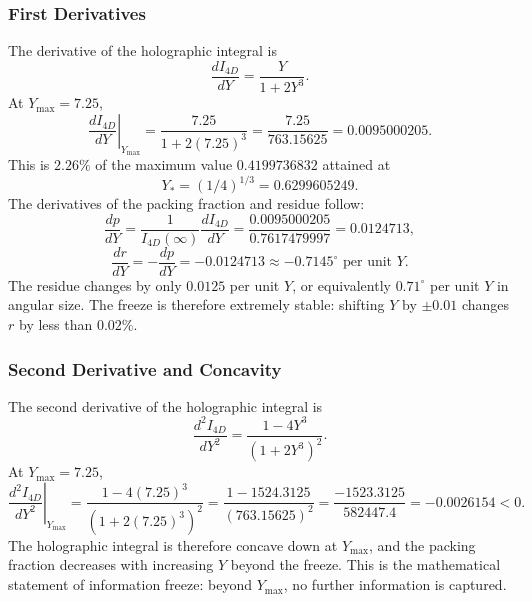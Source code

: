 \documentclass[a4paper,1pt,oneside,openany]{book}
\begin{document}
\subsubsection{First Derivatives}

The derivative of the holographic integral is
\begin{equation}
\frac{dI_{4D}}{dY} = \frac{Y}{1 + 2Y^3}.
\label{eq:dI4D-dY}
\end{equation}
At $Y_{\max} = 7.25$,
\begin{equation}
\left.\frac{dI_{4D}}{dY}\right|_{Y_{\max}} = \frac{7.25}{1 + 2(7.25)^3} = \frac{7.25}{763.15625} = 0.0095000205.
\label{eq:dI4D-dY-Ymax}
\end{equation}
This is $2.26\%$ of the maximum value $0.4199736832$ attained at
\begin{equation}
Y_* = (1/4)^{1/3} = 0.6299605249.
\label{eq:Ystar}
\end{equation}
The derivatives of the packing fraction and residue follow:
\begin{equation}
\frac{dp}{dY} = \frac{1}{I_{4D}(\infty)} \frac{dI_{4D}}{dY} = \frac{0.0095000205}{0.7617479997} = 0.0124713,
\label{eq:dp-dY}
\end{equation}
\begin{equation}
\boxed{\frac{dr}{dY} = -\frac{dp}{dY} = -0.0124713 \approx -0.7145^\circ \text{ per unit } Y.}
\label{eq:dr-dY}
\end{equation}
The residue changes by only $0.0125$ per unit $Y$, or equivalently $0.71^\circ$ per unit $Y$ in angular size. The freeze is therefore extremely stable: shifting $Y$ by $\pm 0.01$ changes $r$ by less than $0.02\%$.

\subsubsection{Second Derivative and Concavity}

The second derivative of the holographic integral is
\begin{equation}
\frac{d^2I_{4D}}{dY^2} = \frac{1 - 4Y^3}{(1 + 2Y^3)^2}.
\label{eq:d2I4D-dY2}
\end{equation}
At $Y_{\max} = 7.25$,
\begin{equation}
\left.\frac{d^2I_{4D}}{dY^2}\right|_{Y_{\max}} = \frac{1 - 4(7.25)^3}{(1 + 2(7.25)^3)^2} = \frac{1 - 1524.3125}{(763.15625)^2} = \frac{-1523.3125}{582447.4} = -0.0026154 < 0.
\label{eq:d2I4D-dY2-Ymax}
\end{equation}
The holographic integral is therefore concave down at $Y_{\max}$, and the packing fraction decreases with increasing $Y$ beyond the freeze. This is the mathematical statement of information freeze: beyond $Y_{\max}$, no further information is captured.
\end{document}
